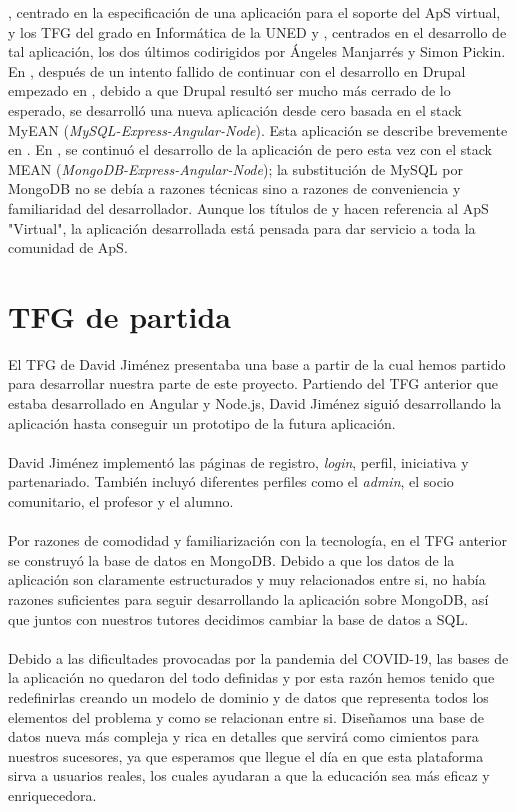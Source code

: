 \documentclass[11pt]{book}
\begin{document}
\cite{ref3}, centrado en la especificación de una aplicación para el soporte del
ApS virtual, y los TFG del grado en Informática de la UNED \cite{ref4} y \cite{ref5},
centrados en el desarrollo de tal aplicación, los dos últimos
codirigidos por Ángeles Manjarrés y Simon Pickin. En \cite{ref4}, después de un
intento fallido de continuar con el desarrollo en Drupal empezado en
\cite{ref3}, debido a que Drupal resultó ser mucho más cerrado de lo esperado,
se desarrolló una nueva aplicación desde cero basada en el stack MyEAN
(\emph{MySQL-Express-Angular-Node}). Esta aplicación se describe brevemente en
\cite{ref6}. En \cite{ref5}, se continuó el desarrollo de la aplicación de \cite{ref4} pero esta
vez con el stack MEAN (\emph{MongoDB-Express-Angular-Node}); la substitución de
MySQL por MongoDB no se debía a razones técnicas sino a razones de
conveniencia y familiaridad del desarrollador. Aunque los títulos de \cite{ref4}
y \cite{ref5} hacen referencia al ApS "Virtual", la aplicación desarrollada está
pensada para dar servicio a toda la comunidad de ApS.


\section{TFG de partida}
El TFG de David Jiménez presentaba una base a partir de la cual hemos partido para desarrollar nuestra parte de este proyecto. Partiendo del TFG anterior que estaba desarrollado en Angular y Node.js, David Jiménez siguió desarrollando la aplicación hasta conseguir un prototipo de la futura aplicación.\\\\
David Jiménez implementó las páginas de registro, \textit{login}, perfil, iniciativa y partenariado. También incluyó diferentes perfiles como el \textit{admin}, el socio comunitario, el profesor y el alumno.\\\\
 Por razones de comodidad y familiarización con la tecnología, en el TFG anterior se construyó la base de datos en MongoDB. Debido a que los datos de la aplicación son claramente estructurados y muy relacionados entre si, no había razones suficientes para seguir desarrollando la aplicación sobre MongoDB, así que juntos con nuestros tutores decidimos cambiar la base de datos a SQL.\\\\
Debido a las dificultades provocadas por la pandemia del COVID-19, las bases de la aplicación no quedaron del todo definidas y por esta razón hemos tenido que redefinirlas creando un modelo de dominio y de datos que representa todos los elementos del problema y como se relacionan entre si. Diseñamos una base de datos nueva más compleja y rica en detalles que servirá como cimientos para nuestros sucesores, ya que esperamos que llegue el día en que esta plataforma sirva a usuarios reales, los cuales ayudaran a que la educación sea más eficaz y enriquecedora.
 
\end{document}
